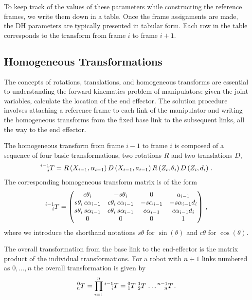 \documentclass[11pt, onecolumn, oneside, reqno]{article}
\begin{document}
To keep track of the values of these parameters while constructing the reference frames, we write them down in a table. Once the frame assignments are made, the DH parameters are typically presented in tabular form. Each row in the table corresponds to the transform from frame $i$ to frame $i+1$.

\subsection{Homogeneous Transformations}
The concepts of rotations, translations, and homogeneous transforms are essential to understanding the forward kinematics problem of manipulators: given the joint variables, calculate the location of the end effector. The solution procedure involves attaching a reference frame to each link of the manipulator and writing the homogeneous transforms from the fixed base link to the subsequent links, all the way to the end effector.

The homogeneous transform from frame $i-1$ to frame $i$ is composed of a sequence of four basic transformations, two rotations $R$ and two translations $D$,
\begin{equation}
\prescript{i-1}{i} T =
R \left(X_{i-1} , \alpha_{i-1}\right) D \left(X_{i-1} , a_{i-1}\right)
R \left(Z_i , \theta_i\right) D \left(Z_i , d_i\right) \, .
\end{equation}
The corresponding homogeneous transform matrix is of the form 
\begin{equation}
\prescript{i-1}{i} T =
\begin{pmatrix}
c \theta_i & -s\theta_i & 0 & a_{i-1} \\
s \theta_i \, c \alpha_{i-1} & c \theta_i \, c \alpha_{i-1} & -s \alpha_{i-1} & -s \alpha_{i-1} d_i \\
s \theta_i \, s \alpha_{i-1} & c \theta_i \, s \alpha_{i-1} &  c \alpha_{i-1} & c \alpha_{i-1} d_i \\
0 & 0 & 0 & 1
\end{pmatrix} \, ,
\end{equation}
where we introduce the shorthand notations $s \theta$ for $\sin (\theta)$ and $c \theta$ for $\cos (\theta)$.

The overall transformation from the base link to the end-effector is the matrix product of the individual transformations. For a robot with $n + 1$ links numbered as $0, \ldots , n$ the overall transformation is given by
\begin{equation}
\prescript{0}{n} T = \prod_{i = 1}^n
\prescript{i-1}{i} T =
\prescript{0}{1} T \, \prescript{1}{2} T \, \ldots \prescript{n-1}{n} T \, .
\end{equation}
\end{document}
